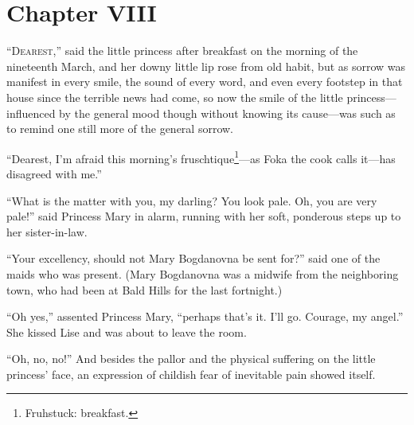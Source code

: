 
\chapter*{Chapter VIII}
\ifaudio     
{} 
\fi

\lettrine[lines=2, loversize=0.3, lraise=0]{``\initfamily D}%
{earest},''
said the little princess after breakfast on the
morning of the nineteenth March, and her downy little lip rose
from old habit, but as sorrow was manifest in every smile, the
sound of every word, and even every footstep in that house since
the terrible news had come, so now the smile of the little
princess---influenced by the general mood though without knowing
its cause---was such as to remind one still more of the general
sorrow.

``Dearest, I'm afraid this morning's
fruschtique\footnote{Fruhstuck: breakfast.}---as Foka the cook
calls it---has disagreed with me.''

``What is the matter with you, my darling? You look pale. Oh, you
are very pale!'' said Princess Mary in alarm, running with her
soft, ponderous steps up to her sister-in-law.

``Your excellency, should not Mary Bogdanovna be sent for?'' said
one of the maids who was present. (Mary Bogdanovna was a midwife
from the neighboring town, who had been at Bald Hills for the
last fortnight.)

``Oh yes,'' assented Princess Mary, ``perhaps that's it. I'll
go. Courage, my angel.'' She kissed Lise and was about to leave
the room.

``Oh, no, no!'' And besides the pallor and the physical suffering
on the little princess' face, an expression of childish fear of
inevitable pain showed itself.

